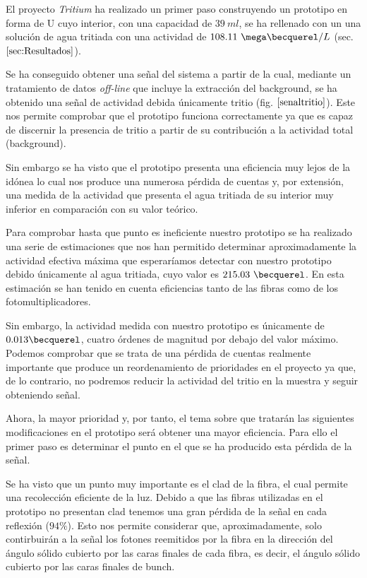 El proyecto \textit{Tritium} ha realizado un primer paso construyendo un prototipo en forma de U cuyo interior, con una capacidad de $39~ml$, se ha rellenado con un una solución de agua tritiada con una actividad de $108.11~\mega\becquerel/L$ (sec. $\ref{sec:Resultados}$).

Se ha conseguido obtener una señal del sistema a partir de la cual, mediante un tratamiento de datos \textit{off-line} que incluye la extracción del background, se ha obtenido una señal de actividad debida únicamente tritio (fig. $\ref{senaltritio}$). Este nos permite comprobar que el prototipo funciona correctamente ya que es capaz de discernir la presencia de tritio a partir de su contribución a la actividad total (background).

Sin embargo se ha visto que el prototipo presenta una eficiencia muy lejos de la idónea lo cual nos produce una numerosa pérdida de cuentas y, por extensión, una medida de la actividad que presenta el agua tritiada de su interior muy inferior en comparación con su valor teórico. 

Para comprobar hasta que punto es ineficiente nuestro prototipo se ha realizado una serie de estimaciones que nos han permitido determinar aproximadamente la actividad efectiva máxima que esperaríamos detectar con nuestro prototipo debido únicamente al agua tritiada, cuyo valor es $215.03~\becquerel$. En esta estimación se han tenido en cuenta eficiencias tanto de las fibras como de los fotomultiplicadores. 

Sin embargo, la actividad medida con nuestro prototipo es únicamente de $0.013\becquerel$, cuatro órdenes de magnitud por debajo del valor máximo. Podemos comprobar que se trata de una pérdida de cuentas realmente importante que produce un reordenamiento de prioridades en el proyecto ya que, de lo contrario, no podremos reducir la actividad del tritio en la muestra y seguir obteniendo señal. 

Ahora, la mayor prioridad y, por tanto, el tema sobre que tratarán las siguientes modificaciones en el prototipo será obtener una mayor eficiencia. Para ello el primer paso es determinar el punto en el que se ha producido esta pérdida de la señal. 

Se ha visto que un punto muy importante es el clad de la fibra, el cual permite una recolección eficiente de la luz. Debido a que las fibras utilizadas en el prototipo no presentan clad tenemos una gran pérdida de la señal en cada reflexión ($94\%$). Esto nos permite considerar que, aproximadamente, solo contirbuirán a la señal los fotones reemitidos por la fibra en la dirección del ángulo sólido cubierto por las caras finales de cada fibra, es decir, el ángulo sólido cubierto por las caras finales de bunch. 


